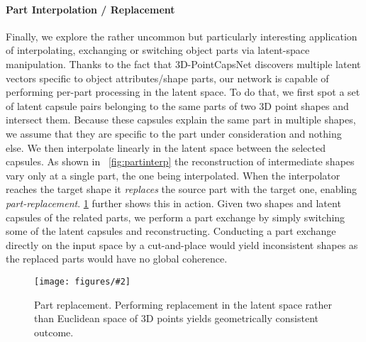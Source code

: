 \documentclass[10pt,twocolumn,letterpaper]{article}
\theoremstyle{break}
\newcommand{\insertimageC}[5]{ \begin{figure}[#5]
\centering
\texttt{[image: figures/\#2]}
\caption{#3}
\label{#4}
\end{figure}
}
\begin{document}
\paragraph{Part Interpolation / Replacement}
Finally, we explore the rather uncommon but particularly interesting application of interpolating, exchanging or switching object parts via latent-space manipulation.
Thanks to the fact that 3D-PointCapsNet discovers multiple latent vectors specific to object attributes/shape parts, our network is capable of performing per-part processing in the latent space. To do that, we first spot a set of latent capsule pairs belonging to the same parts of two 3D point shapes and intersect them. Because these capsules explain the same part in multiple shapes, we assume that they are specific to the part under consideration and nothing else.
We then interpolate linearly in the latent space between the selected capsules. As shown in ~\cref{fig:partinterp} the reconstruction of intermediate shapes vary only at a single part, the one being interpolated. When the interpolator reaches the target shape it \textit{replaces} the source part with the target one, enabling \textit{part-replacement}. \cref{fig:partreplace} further shows this in action. Given two shapes and latent capsules of the related parts, we perform a part exchange by simply switching some of the latent capsules and reconstructing. Conducting a part exchange directly on the input space by a cut-and-place would yield inconsistent shapes as the replaced parts would have no global coherence.

\insertimageC{1}{allign.pdf}{Part replacement. Performing replacement in the latent space rather than Euclidean space of 3D points yields geometrically consistent outcome.\vspace{-3mm}}{fig:partreplace}{t!}
\end{document}
